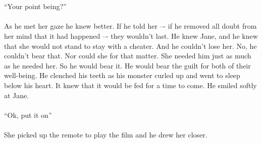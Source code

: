 \\\\	
“Your point being?”
\\\\
As he met her gaze he knew better. If he told her –- if he removed all doubt from her mind that it had happened –- they wouldn’t last. He knew Jane, and he knew that she would not stand to stay with a cheater. And he couldn’t lose her. No, he couldn’t bear that. Nor could she for that matter. She needed him just as much as he needed her. So he would bear it. He would bear the guilt for both of their well-being. He clenched his teeth as his monster curled up and went to sleep below his heart. It knew that it would be fed for a time to come. He smiled softly at Jane.
\\\\
“Ok, put it on”
\\\\
She picked up the remote to play the film and he drew her closer.